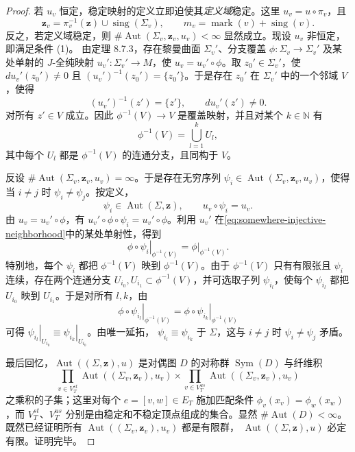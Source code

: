 \begin{proof}
若 $u_v$ 恒定，稳定映射的定义立即迫使其\emph{定义域}稳定。这里
$u_v=u\circ\pi_v$，且
\[
 \boldsymbol z_v=\pi_v^{-1}(\boldsymbol z)\cup\operatorname{sing}(\Sigma_v),
 \qquad m_v=\operatorname{mark}(v)+\operatorname{sing}(v).
\]
反之，若定义域稳定，则
$\#\operatorname{Aut}(\Sigma_v,\boldsymbol z_v,u_v)<\infty$ 显然成立。现设 $u_v$ 非恒定，即满足条件 (1)。
由定理 8.7.3，存在黎曼曲面 $\Sigma_v'$、分支覆盖
$\phi:\Sigma_v\to\Sigma_v'$ 及某处单射的 $J$-全纯映射
$u_v':\Sigma_v'\to M$，使 $u_v=u_v'\circ\phi$。取
$z_0'\in\Sigma_v'$，使 $du_v'(z_0')\ne0$ 且
$(u_v')^{-1}(z_0')=\{z_0'\}$。于是存在 $z_0'$ 在 $\Sigma_v'$ 中的一个邻域
$V$，使得
\begin{equation}
 (u_v')^{-1}(z')=\{z'\},\qquad du_v'(z')\ne0.
 \label{eq:somewhere-injective-neighborhood}
\end{equation}
对所有 $z'\in V$ 成立。因此 $\phi^{-1}(V)\to V$ 是覆盖映射，并且对某个
$k\in\mathbb N$ 有
\[
 \phi^{-1}(V)=\bigcup_{l=1}^kU_l,
\]
其中每个 $U_l$ 都是 $\phi^{-1}(V)$ 的连通分支，且同构于 $V$。

反设 $\#\operatorname{Aut}(\Sigma_v,\boldsymbol z_v,u_v)=\infty$。于是存在无穷序列
$\psi_i\in\operatorname{Aut}(\Sigma_v,\boldsymbol z_v,u_v)$，使得当 $i\ne j$ 时
$\psi_i\ne\psi_j$。按定义，
\[
 \psi_i\in\operatorname{Aut}(\Sigma,\boldsymbol z),
 \qquad u_v\circ\psi_i=u_v.
\]
由 $u_v=u_v'\circ\phi$，有
$u_v'\circ\phi\circ\psi_i=u_v'\circ\phi$。利用
$u_v'$ 在\eqref{eq:somewhere-injective-neighborhood}中的某处单射性，得到
\[
 \left.\phi\circ\psi_i\right|_{\phi^{-1}(V)}
 =\left.\phi\right|_{\phi^{-1}(V)}.
\]
特别地，每个 $\psi_i$ 都把 $\phi^{-1}(V)$ 映到 $\phi^{-1}(V)$。由于
$\phi^{-1}(V)$ 只有有限张且 $\psi_i$ 连续，存在两个连通分支
$U_{i_0},U_{i_1}\subset\phi^{-1}(V)$，并可选取子列 $\psi_{i_l}$，使每个
$\psi_{i_l}$ 都把 $U_{i_0}$ 映到 $U_{i_1}$。于是对所有 $l,k$，由
\[
 \left.\phi\circ\psi_{i_l}\right|_{\phi^{-1}(V)}
 =\left.\phi\circ\psi_{i_k}\right|_{\phi^{-1}(V)}
\]
可得
$\left.\psi_{i_l}\right|_{U_{i_0}}
 \equiv\left.\psi_{i_k}\right|_{U_{i_0}}$。由唯一延拓，
$\psi_{i_l}\equiv\psi_{i_k}$ 于 $\Sigma$，这与 $i\ne j$ 时
$\psi_i\ne\psi_j$ 矛盾。

最后回忆，$\operatorname{Aut}((\Sigma,\boldsymbol z),u)$ 是对偶图 $D$ 的对称群
$\operatorname{Sym}(D)$ 与纤维积
\[
 \prod_{v\in V_T^{st}}\operatorname{Aut}((\Sigma_v,\boldsymbol z_v),u_v)
 \times
 \prod_{v\in V_T^{us}}\operatorname{Aut}((\Sigma_v,\boldsymbol z_v),u_v)
\]
之乘积的子集；这里对每个 $e=[v,w]\in E_T$ 施加匹配条件
$\phi_v(x_v)=\phi_w(x_w)$，而 $V_T^{st}$、$V_T^{us}$ 分别是由稳定和不稳定顶点组成的集合。显然
$\#\operatorname{Aut}(D)<\infty$。既然已经证明所有
$\operatorname{Aut}((\Sigma_v,\boldsymbol z_v),u_v)$ 都是有限群，
$\operatorname{Aut}((\Sigma,\boldsymbol z),u)$ 必定有限。证明完毕。
\end{proof}

